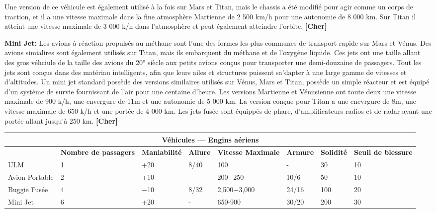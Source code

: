 Une version de ce véhicule est également utilisé à la fois sur Mars et Titan, mais le chassis a été modifié pour agir comme un corps de traction, et il a une vitesse maximale dans la fine atmosphère Martienne de 2 500 km/h pour une autonomie de 8 000 km. Sur Titan il atteint une vitesse maximale de 3 000 k/h dans l'atmosphère et peut également atteindre l'orbite. \textbf{[Cher]} 

\textbf{Mini Jet:} Les avions à réaction propulsés au méthane sont l'une des formes les plus communes de transport rapide sur Mars et Vénus. Des avions simialires sont également utilisés sur Titan, mais ils embarquent du méthane et de l'oxygène liquide. Ces jets ont une taille allant des gros véhciule de la taille des avions du 20° siècle aux petits avions conçus pour transporter une demi-douzaine de passagers. Tout les jets sont conçus dans des matériau intelligents, afin que leurs ailes et structures puissent sa'dapter à une large gamme de vitesses et d'altitudes. Un mini jet standard possède des versions similaires utilisés sur Vénus, Mars et Titan, possède un simple réacteur et est équipé d'un système de survie fournissant de l'air pour une centaine d'heure. Les versions Martienne et Vénusienne ont toute deux une vitesse maximale de 900 k/h, une envergure de 11m et une autonomie de 5 000 km. La version conçue pour Titan a une enevrgure de 8m, une vitesse maximale de 650 k/h et une portée de 4 000 km. Les jets fusée sont équippés de phare, d'amplificateurs radios et de radar ayant une portée allant jusqu'à 250 km. \textbf{[Cher]} 

\begin{table} \begin{tabularx}{\textwidth}{|X|X|X|X|X|l|l|X|} \hline

\multicolumn{8}{|c|}{\textbf{Véhicules --- Engins aériens}} \\ \hline

&\textbf{Nombre de passagers}	&\textbf{Maniabilité}	&\textbf{Allure}	&\textbf{Vitesse Maximale}	&\textbf{Armure}	&\textbf{Solidité}	&\textbf{Seuil de blessure} \\ \hline

ULM	&1	&+20	&8/40	&100	&- &30	&10 \\ \hline

Avion Portable	&2	&+10	&- &200$-$250	&10/6	&50	&10 \\ \hline

Buggie Fusée	&4	&$-$10	&8/32	&2,500$-$3,000	&24/16	&100	&20 \\ \hline

Mini Jet	&6	&+20	&- &650-900	&30/20	&200	&30 \\ \hline

\end{tabularx} \label{tab:aircraft} \end{table} 



